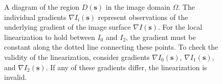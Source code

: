 \documentclass{article}
\begin{document}
\begin{figure}[h]
    \centering
    \caption{A diagram of the region \(D(\mathbf{s})\) in the image domain \(\Omega\). The individual gradients \(\nabla I_i(\mathbf{s})\) represent observations of the underlying gradient of the image surface \(\nabla I(\mathbf{s})\). For the local linearization to hold between \(I_0\) and \(I_2\), the gradient must be constant along the dotted line connecting these points. To check the validity of the linearization, consider gradients \(\nabla I_0(\mathbf{s})\), \(\nabla I_1(\mathbf{s})\), and \(\nabla I_2(\mathbf{s})\). If any of these gradients differ, the linearization is invalid.}
    \label{fig:image_domain}
\end{figure}
\end{document}
